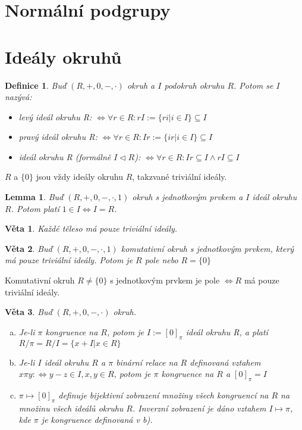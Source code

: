 \documentclass[a4paper, 11pt]{report}
\newtheorem{mydef}{Definice}[chapter]
\newtheorem{veta}{Věta}[chapter]
\newtheorem{lemma}{Lemma}[chapter]
\begin{document}
\section{Normální podgrupy}
\section{Ideály okruhů}

\begin{mydef}
Buď $(R, +, 0, -, \cdot)$ okruh a $I$ podokruh okruhu $R$. Potom se $I$ nazývá:
\begin{itemize}
	\item \emph{levý ideál} okruhu R: $\Leftrightarrow \forall r \in R: rI := \{ri | i \in I\} \subseteq I$
	\item \emph{pravý ideál} okruhu R: $\Leftrightarrow \forall r \in R: Ir := \{ir | i \in I\} \subseteq I$
	\item \emph{ideál} okruhu R (formálně $I \triangleleft R$): $\Leftrightarrow \forall r \in R: Ir  \subseteq I \land rI \subseteq I$
\end{itemize}
\end{mydef}

$R$ a $\{0\}$ jsou vždy ideály okruhu $R$, takzvané triviální ideály.

\begin{lemma}
Buď $(R, +, 0, -, \cdot, 1)$ okruh s jednotkovým prvkem a $I$ ideál okruhu $R$. Potom platí $1 \in I \Leftrightarrow I = R$.
\end{lemma}

\begin{veta}
Každé těleso má pouze triviální ideály.
\end{veta}

\begin{veta}
Buď $(R, +, 0, -, \cdot, 1)$ komutativní okruh s jednotkovým prvkem, který má pouze triviální ideály. Potom je $R$ pole nebo $R = \{0\}$
\end{veta}

Komutativní okruh $R \not= \{0\}$ s jednotkovým prvkem je pole $\Leftrightarrow R$ má pouze triviální ideály.

\begin{veta}
Buď $(R, +, 0, -, \cdot)$ okruh.
\begin{enumerate}[a)]
	\item Je-li $\pi$ kongruence na $R$, potom je $I := [0]_\pi$ ideál okruhu R, a platí $R/\pi = R/I = \{x + I | x \in R\}$
	\item Je-li $I$ ideál okruhu $R$ a $\pi$ binární relace na $R$ definovaná vztahem $x \pi y :\Leftrightarrow y - z \in I, x,y \in R$, potom je $\pi$ kongruence na $R$ a $[0]_\pi = I$
	\item $\pi \mapsto [0]_\pi$ definuje bijektivní zobrazení množiny všech kongruencí na $R$ na množinu všech ideálů okruhu $R$. Inverzní zobrazení je dáno vztahem $I \mapsto \pi$, kde $\pi$ je kongruence definovaná v b). 
\end{enumerate}
\end{veta}
\end{document}
